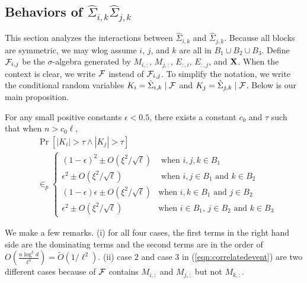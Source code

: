 
\subsection{Behaviors of $\hat \Sigma_{i,k} \hat \Sigma_{j,k}$}\label{sec:secondmoment}

This section analyzes the interactions between $\hat \Sigma_{i,k}$ and $\hat \Sigma_{j,k}$. Because all blocks are symmetric, we may wlog assume $i$, $j$, and $k$ are all in $B_1 \cup B_2 \cup B_3$. Define $\mathcal{F}_{i,j}$ be the $\sigma$-algebra generated by $M_{i, :}$, $M_{j, :}$, $E_{:, i}$, $E_{:, j}$, and $\mathbf{X}$. When the context is clear, we write $\mathcal{F}$ instead of $\mathcal{F}_{i,j}$. 
To simplify the notation, we write the conditional random variables $K_i = \hat \Sigma_{i, k} \mid \mathcal{F}$ and $K_j = \hat \Sigma_{j, k} \mid \mathcal{F}$. Below is our main proposition. 

\begin{proposition}\label{prop:interaction} For any small positive constants $\epsilon  < 0.5$, there exists a constant $c_0$ and $\tau$ such that when $n > c_0 \ell$, 
{\small
\begin{equation}\label{eqn:correlatedevent}
    \begin{split}
        & \Pr[|K_i| > \tau \wedge |K_j| > \tau] \\
       & \in_p \left\{
       \begin{array}{ll}
        (1-\epsilon)^2 \pm O(\xi^2/\sqrt{\ell})     & \mbox{ when $i,j, k \in B_1$ } \\
        \epsilon^2 \pm O(\xi^2/\sqrt{\ell})    & \mbox{ when $i,j \in B_1$ and $k \in B_2$} \\
        (1-\epsilon)\epsilon \pm O(\xi^2/\sqrt{\ell}) & \mbox{when $i,k \in B_1$ and $j \in B_2$}\\
        \epsilon^2 \pm O(\xi^2/\sqrt{\ell}) & \mbox{when $i \in B_1$, $j \in B_2$ and $k \in B_3$} 
       \end{array}
       \right. 
    \end{split}
\end{equation}
}
\end{proposition}
\iffalse
$\Pr[|K_i| > \tau \wedge |K_j| > \tau\calf]$ can be bounded 
\begin{enumerate}
    \item When $i,j, k \in B_1$: $(1-\epsilon)^2 \pm O(\xi^2/\sqrt{\ell}) 
    $. 
    \item When $i,j \in B_1$ and $k \in B_2$: $\epsilon^2 \pm O(\xi^2/\sqrt{\ell}) 
    $. 
    \item When $i,k \in B_1$ and $j \in B_2$: $(1-\epsilon)\epsilon \pm O(\xi^2/\sqrt{\ell})
    $. 
    \item When $i \in B_1$, $j \in B_2$ and $k \in B_3$: $\epsilon^2 \pm O(\xi^2/\sqrt{\ell}) 
    $. 
\end{enumerate}
\fi
We make a few remarks. (i) for all four cases, the first terms in the right hand side are the dominating terms and the second terms are in the order of $O(\frac{n \log^2d}{\ell^3}) = \tilde O(1/\ell^2)$. (ii) case 2 and case 3 in (\ref{eqn:correlatedevent}) are two different cases because of $\mathcal{F}$ contains $M_{i,:}$ and $M_{j, :}$ but not $M_{k, :}$. 

